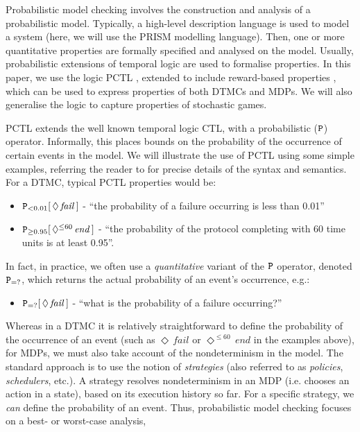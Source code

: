 \documentclass{llncs}
\begin{document}
Probabilistic model checking involves the construction and analysis of a probabilistic model.
Typically, a high-level description language is used to model a system
(here, we will use the PRISM \cite{KNP11} modelling language).
Then, one or more quantitative properties are formally specified and analysed on the model.
Usually, probabilistic extensions of temporal logic are used to formalise properties.
In this paper, we use the logic PCTL \cite{HJ94},
extended to include reward-based properties \cite{KNP07a},
which can be used to express properties of both DTMCs and MDPs.
We will also generalise the logic to capture properties of stochastic games.

PCTL extends the well known temporal logic CTL, with a probabilistic ($\tt P$) operator.
Informally, this places bounds on the probability of the occurrence of certain events in the model.
We will illustrate the use of PCTL using some simple examples,
referring the reader to \cite{HJ94,KNP07a} for precise details of the syntax and semantics.
For a DTMC, typical PCTL properties would be:
\begin{itemize}
\item ${\tt P}_{<0.01}[\,\Diamond\,\mathit{fail}\,]$ -
``the probability of a failure occurring is less than 0.01''
\item ${\tt P}_{\geq 0.95}[\,\Diamond^{\leq 60}\,\mathit{end}\,]$ -
``the probability of the protocol completing with 60 time units is at least 0.95''.
\end{itemize}
In fact, in practice, we often use a \emph{quantitative} variant of the ${\tt P}$ operator,
denoted ${\tt P}_{=?}$, which returns the actual probability of an event's occurrence, e.g.:
\begin{itemize}
\item ${\tt P}_{=?}[\,\Diamond\,\mathit{fail}\,]$ -
``what is the probability of a failure occurring?''
\end{itemize}
Whereas in a DTMC it is relatively straightforward to define the probability of the occurrence
of an event (such as $\Diamond\,\mathit{fail}$ or $\Diamond^{\leq 60}\,\mathit{end}$ in the examples above),
for MDPs, we must also take account of the nondeterminism in the model.
The standard approach is to use the notion of
\emph{strategies} (also referred to as \emph{policies}, \emph{schedulers}, etc.).
A strategy resolves nondeterminism in an MDP (i.e. chooses an action in a state),
based on its execution history so far.
For a specific strategy, we \emph{can} define the probability of an event.
Thus, probabilistic model checking focuses on a best- or worst-case analysis,
\end{document}
